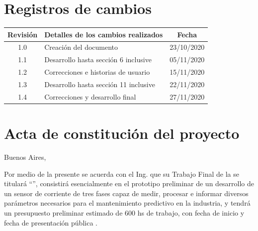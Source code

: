 \documentclass[11pt]{charter}
\begin{document}
\maketitle
\thispagestyle{empty}
\pagebreak


\thispagestyle{empty}
{\setlength{\parskip}{0pt}
\tableofcontents{}
}
\pagebreak


\section{Registros de cambios}
\label{sec:registro}


\begin{table}[ht]
\label{tab:registro}
\centering
\begin{tabularx}{\linewidth}{@{}|c|X|c|@{}}
\hline
\rowcolor[HTML]{C0C0C0} 
Revisión & \multicolumn{1}{c|}{\cellcolor[HTML]{C0C0C0}Detalles de los cambios realizados} & Fecha      \\ \hline
1.0      & Creación del documento                                          & 23/10/2020 \\ \hline
1.1      & Desarrollo hasta sección 6 inclusive                            & 05/11/2020 \\ \hline
1.2      & Correcciones e historias de usuario                            & 15/11/2020 \\ \hline
1.3      & Desarrollo hasta sección 11 inclusive						 & 22/11/2020  \\ \hline
1.4      & Correcciones y desarrollo final						 		& 27/11/2020  \\ \hline
\end{tabularx}
\end{table}

\pagebreak



\section{Acta de constitución del proyecto}
\label{sec:acta}

\begin{flushright}
Buenos Aires, \fechaInicioName
\end{flushright}

\vspace{2cm}

Por medio de la presente se acuerda con el Ing. \authorname\hspace{1px} que su Trabajo Final de la \degreename\hspace{1px} se titulará ``\ttitle'', consistirá esencialmente en el prototipo preliminar de un desarrollo de un sensor de corriente de tres fases capaz de medir, procesar e informar diversos parámetros necesarios para el mantenimiento predictivo en la industria, y tendrá un presupuesto preliminar estimado de 600 hs de trabajo, con fecha de inicio \fechaInicioName\hspace{1px} y fecha de presentación pública \fechaFinalName.
\end{document}
